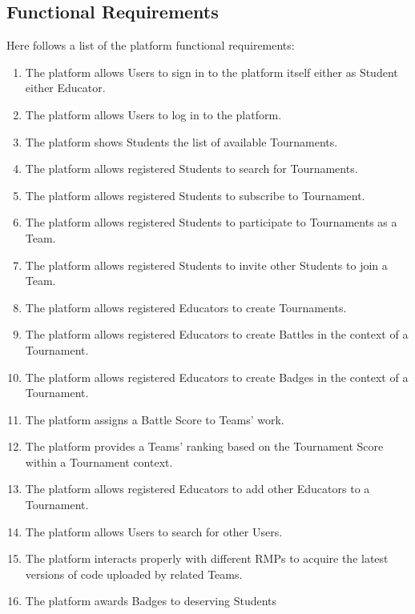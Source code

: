 \subsection{Functional Requirements}
Here follows a list of the platform functional requirements:
\begin{enumerate}[label= \textbf{R\arabic*}]
    \item The platform allows Users to sign in to the platform itself either as Student either Educator. \label{req:reqSignin}
    \item The platform allows Users to log in to the platform. \label{req:reqLogin}
    \item The platform shows Students the list of available Tournaments. \label{req:reqShowTournaments}
    \item The platform allows registered Students to search for Tournaments. \label{req:reqSearchForTournament}
    \item The platform allows registered Students to subscribe to Tournament. \label{req:reqTournamentSubscription}
    \item The platform allows registered Students to participate to Tournaments as a Team. \label{req:reqCreateTeam}
    \item The platform allows registered Students to invite other Students to join a Team. \label{req:reqJoinTeam}
    \item The platform allows registered Educators to create Tournaments. \label{req:reqCreateTournaments}
    \item The platform allows registered Educators to create Battles in the context of a Tournament. \label{req:reqCreateBattle}
    \item The platform allows registered Educators to create Badges in the context of a Tournament. \label{req:reqCreateBadge}
    \item The platform assigns a Battle Score to Teams' work. \label{req:reqEvaluateCode}
    \item The platform provides a Teams' ranking based on the Tournament Score within a Tournament context. \label{req:reqRankingsUpdate}
    \item The platform allows registered Educators to add other Educators to a Tournament. \label{req:reqJoinManagement}
    \item The platform allows Users to search for other Users. \label{req:reqSearchForUsers}
    \item The platform interacts properly with different RMPs to acquire the latest versions of code uploaded by related Teams. \label{req:reqPullRMP}
    \item The platform awards Badges to deserving Students \label{req:reqAssignBadge}
\end{enumerate}

